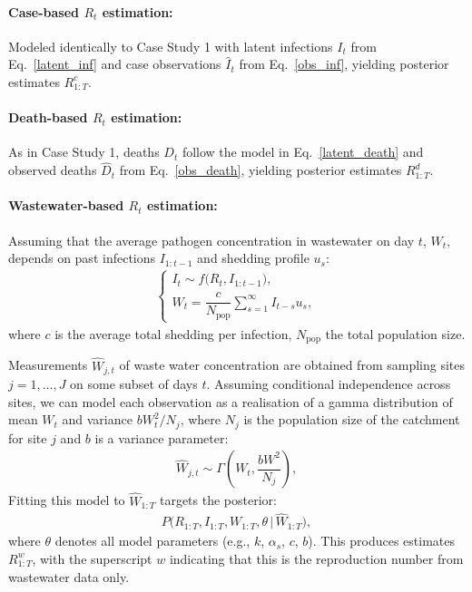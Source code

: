 \documentclass{article}
\begin{document}
\paragraph{Case-based $R_t$ estimation:}  
Modeled identically to Case Study 1 with latent infections $I_t$ from Eq.~\eqref{latent_inf} and case observations $\widehat{I}_t$ from  Eq.~\eqref{obs_inf}, yielding posterior estimates $R_{1:T}^c$.

\paragraph{Death-based $R_t$ estimation:}  
As in Case Study 1, deaths $D_t$ follow the model in Eq.~\eqref{latent_death} and observed deaths $\widehat{D}_t$ from  Eq.~\eqref{obs_death}, yielding posterior estimates $R_{1:T}^d$.

\paragraph{Wastewater-based $R_t$ estimation:}  
Assuming that the average pathogen concentration in wastewater on day $t$, $W_t$, depends on past infections $I_{1:t-1}$ and shedding profile $u_s$:
\begin{align}
\begin{cases}
I_t \sim f\big(R_t, I_{1:t-1}\big),\\[4pt]
W_t =\dfrac{c}{N_{\mathrm{pop}}} \sum_{s=1}^\infty I_{t-s} u_s ,
\end{cases}
\end{align}
where $c$ is the average total shedding per infection, $N_{\mathrm{pop}}$ the total population size. 

Measurements $\widehat{W}_{j,t}$ of waste water concentration are obtained from sampling sites $j=1,\ldots,J$ on some subset of days $t$.  Assuming conditional independence across sites, we can model each observation as a realisation  of a gamma distribution of  mean $W_t$ and variance $b W_t^2/N_j$, where $N_j$ is the population size of the catchment for site $j$ and $b$ is a variance parameter:
\begin{align}
\widehat{W}_{j,t} \sim \Gamma\left( W_t, \dfrac{bW^2}{N_j}\right),
\end{align}
Fitting this model to $\widehat{W}_{1:T}$ targets the posterior:
\begin{align}
P\big(R_{1:T}, I_{1:T}, W_{1:T}, \theta \,\big|\, \widehat{W}_{1:T}\big),
\end{align}
where $\theta$ denotes all model parameters (e.g., $k$, $\alpha_s$, $c$, $b$).  This produces estimates $R_{1:T}^w$, with the superscript $w$ indicating that this is the reproduction number from wastewater data only. 
\end{document}
